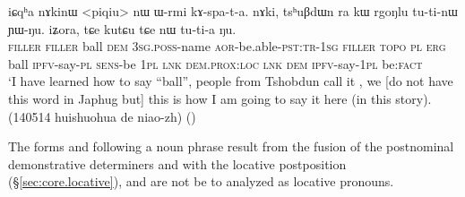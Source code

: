 \begin{exe}
\ex \label{ex:kutCu.tCe.nW.tutia}
\gll iɕqʰa nɤkinɯ <piqiu> nɯ ɯ-rmi kɤ-spa-t-a. nɤki, tsʰuβdɯn ra kɯ rgoŋlu tu-ti-nɯ ɲɯ-ŋu. iʑora, tɕe kutɕu tɕe nɯ tu-ti-a ŋu. \\
\textsc{filler} \textsc{filler} ball \textsc{dem} \textsc{3sg}.\textsc{poss}-name \textsc{aor}-be.able-\textsc{pst}:\textsc{tr}-\textsc{1sg} \textsc{filler}  \textsc{topo} \textsc{pl} \textsc{erg} ball \textsc{ipfv}-say-\textsc{pl} \textsc{sens}-be \textsc{1pl} \textsc{lnk} \textsc{dem}.\textsc{prox}:\textsc{loc} \textsc{lnk} \textsc{dem} \textsc{ipfv}-say-\textsc{1pl} be:\textsc{fact} \\
\glt `I have learned how to say ``ball'', people from Tshobdun call it , we [do not have this word in Japhug but] this is how I am going to say it here (in this story). (140514 huishuohua de niao-zh)
()
\end{exe}

The forms  and  following a noun phrase result from the fusion of the postnominal demonstrative determiners  and  with the locative postposition  (§\ref{sec:core.locative}), and are not be to analyzed as locative pronouns.

